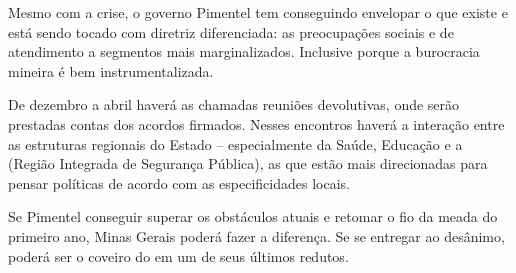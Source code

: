 Mesmo com a crise, o governo Pimentel tem conseguindo envelopar o que
existe e está sendo tocado com diretriz diferenciada: as preocupações
sociais e de atendimento a segmentos mais marginalizados. Inclusive
porque a burocracia mineira é bem instrumentalizada.

De dezembro a abril haverá as chamadas reuniões devolutivas, onde serão
prestadas contas dos acordos firmados. Nesses encontros haverá a
interação entre as estruturas regionais do Estado -- especialmente da
Saúde, Educação e a  (Região Integrada de Segurança Pública), as que
estão mais direcionadas para pensar políticas de acordo com as
especificidades locais.

Se Pimentel conseguir superar os obstáculos atuais e retomar o fio da
meada do primeiro ano, Minas Gerais poderá fazer a diferença. Se se
entregar ao desânimo, poderá ser o coveiro do  em um de seus últimos
redutos.
